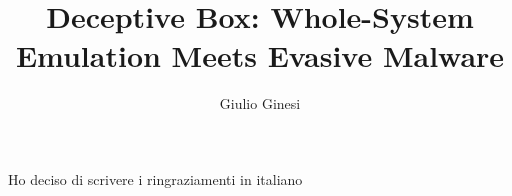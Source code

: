 \documentclass[LaM,binding=0.6cm]{sapthesis}
\title{Deceptive Box: Whole-System Emulation Meets Evasive Malware}
\author{Giulio Ginesi}
\begin{document}
\frontmatter

\maketitle



\begin{acknowledgments}
Ho deciso di scrivere i ringraziamenti in italiano

\end{acknowledgments}

\tableofcontents

\mainmatter








\backmatter
\cleardoublepage
{}
\end{document}
